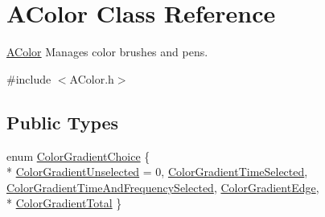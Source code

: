 \hypertarget{class_a_color}{}\section{A\+Color Class Reference}
\label{class_a_color}


\hyperlink{class_a_color}{A\+Color} Manages color brushes and pens.  




{\ttfamily \#include $<$A\+Color.\+h$>$}

\subsection*{Public Types}
\begin{DoxyCompactItemize}
\item 
enum \hyperlink{class_a_color_a3a1a5b4ab4055f09810d58a166f61bfe}{Color\+Gradient\+Choice} \{ \\*
\hyperlink{class_a_color_a3a1a5b4ab4055f09810d58a166f61bfea341b5b9c96dc41728b34bd4cb7ecaf29}{Color\+Gradient\+Unselected} = 0, 
\hyperlink{class_a_color_a3a1a5b4ab4055f09810d58a166f61bfeaf8b5b6cc1c291340c167ed73787e70e2}{Color\+Gradient\+Time\+Selected}, 
\hyperlink{class_a_color_a3a1a5b4ab4055f09810d58a166f61bfea994bbd5ca3c5a1e50383f71482576ca9}{Color\+Gradient\+Time\+And\+Frequency\+Selected}, 
\hyperlink{class_a_color_a3a1a5b4ab4055f09810d58a166f61bfeabdd31fd590dccaefd1f2ab6df45f85aa}{Color\+Gradient\+Edge}, 
\\*
\hyperlink{class_a_color_a3a1a5b4ab4055f09810d58a166f61bfea2c26e4fa9bddb6b55415066260d4fcb9}{Color\+Gradient\+Total}
 \}
\end{DoxyCompactItemize}
